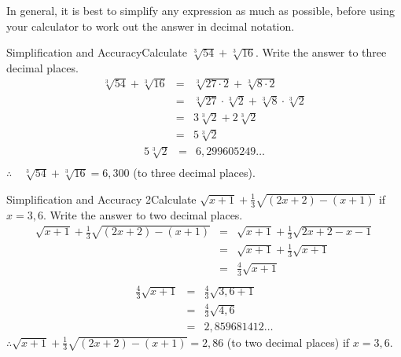 In general, it is best to simplify any expression as much as possible, before using your calculator to work out the answer in decimal notation.


\begin{wex}{Simplification and Accuracy}{Calculate $\sqrt[3]{54}+\sqrt[3]{16}$. Write the answer to three decimal places.}{
\begin{eqnarray*}
\sqrt[3]{54}+\sqrt[3]{16}&=&\sqrt[3]{27 \cdot 2}+\sqrt[3]{8 \cdot 2}\\
&=&\sqrt[3]{27} \cdot \sqrt[3]{2}+\sqrt[3]{8} \cdot \sqrt[3]{2}\\
&=&3 \sqrt[3]{2}+2 \sqrt[3]{2}\\
&=&5 \sqrt[3]{2}
\end{eqnarray*}
\begin{eqnarray*}
5 \sqrt[3]{2}&=&6,299605249\ldots\\
\end{eqnarray*}
$\therefore \quad \sqrt[3]{54}+\sqrt[3]{16}=6,300$ (to three decimal places).}
\end{wex}

\begin{wex}{Simplification and Accuracy 2}{Calculate $\sqrt{x+1}+\frac{1}{3}\sqrt{(2x+2)-(x+1)}$ if $x=3,6$. Write the answer to two decimal places.}{
\begin{eqnarray*}
\sqrt{x+1}+\frac{1}{3}\sqrt{(2x+2)-(x+1)}&=&\sqrt{x+1}+\frac{1}{3}\sqrt{2x+2-x-1}\\
&=&\sqrt{x+1}+\frac{1}{3}\sqrt{x+1}\\
&=&\frac{4}{3}\sqrt{x+1}\\
\end{eqnarray*}
\begin{eqnarray*}
\frac{4}{3}\sqrt{x+1}&=&\frac{4}{3}\sqrt{3,6+1}\\
&=&\frac{4}{3}\sqrt{4,6}\\
&=&2,859681412 \ldots
\end{eqnarray*}
$\therefore \sqrt{x+1}+\frac{1}{3}\sqrt{(2x+2)-(x+1)}=2,86$ (to two decimal places) if $x=3,6$.}
\end{wex}

